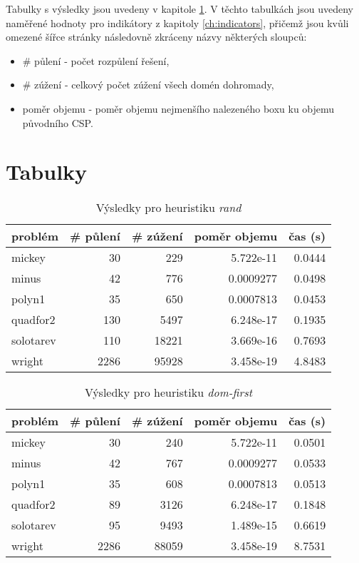 {Tabulky s výsledky jsou uvedeny v kapitole \ref{ch:resultTables}. V těchto tabulkách jsou uvedeny naměřené hodnoty pro indikátory z kapitoly \ref{ch:indicators}, přičemž jsou kvůli omezené šířce stránky následovně zkráceny názvy některých sloupců:


\begin{itemize}
    \item \# půlení - počet rozpůlení řešení,
    \item \# zúžení - celkový počet zúžení všech domén dohromady,
    \item poměr objemu - poměr objemu nejmenšího nalezeného boxu ku objemu původního CSP.
\end{itemize}


\section{Tabulky}
\label{ch:resultTables}

\begin{table}[H]
\centering
\begin{tabular}{lrrrr}
\hline
problém & \# půlení & \# zúžení & poměr objemu & čas (s) \\ \hline
mickey & 30 & 229 & 5.722e-11 & 0.0444 \\
minus & 42 & 776 & 0.0009277 & 0.0498 \\
polyn1 & 35 & 650 & 0.0007813 & 0.0453 \\
quadfor2 & 130 & 5497 & 6.248e-17 & 0.1935 \\
solotarev & 110 & 18221 & 3.669e-16 & 0.7693 \\
wright & 2286 & 95928 & 3.458e-19 & 4.8483 \\
\end{tabular}
\caption{Výsledky pro heuristiku \emph{rand}}
\label{rand}
\end{table}



\begin{table}[H]
\centering
\begin{tabular}{lrrrr}
\hline
problém & \# půlení & \# zúžení & poměr objemu & čas (s) \\ \hline
mickey & 30 & 240 & 5.722e-11 & 0.0501 \\
minus & 42 & 767 & 0.0009277 & 0.0533 \\
polyn1 & 35 & 608 & 0.0007813 & 0.0513 \\
quadfor2 & 89 & 3126 & 6.248e-17 & 0.1848 \\
solotarev & 95 & 9493 & 1.489e-15 & 0.6619 \\
wright & 2286 & 88059 & 3.458e-19 & 8.7531 \\
\end{tabular}
\caption{Výsledky pro heuristiku \emph{dom-first}}
\label{dom-first}
\end{table}



}
